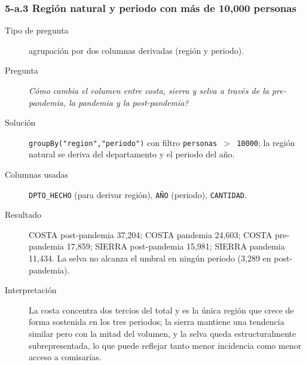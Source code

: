 \subsubsection*{5-a.3 \textbar{} Regi\'on natural y periodo con m\'as de 10,000 personas}
\begin{description}
\item[Tipo de pregunta] agrupaci\'on por dos columnas derivadas (regi\'on y periodo).
\item[Pregunta] \emph{C\'omo cambia el volumen entre costa, sierra y selva a trav\'es de la
      pre-pandemia, la pandemia y la post-pandemia?}
\item[Soluci\'on] \texttt{groupBy("region","periodo")} con filtro \texttt{personas $>$ 10000};
      la regi\'on natural se deriva del departamento y el periodo del a\~no.
\item[Columnas usadas] \texttt{DPTO\_HECHO} (para derivar regi\'on), \texttt{A\~NO} (periodo),
      \texttt{CANTIDAD}.
\item[Resultado] COSTA post-pandemia 37,204; COSTA pandemia 24,603; COSTA pre-pandemia 17,859;
      SIERRA post-pandemia 15,981; SIERRA pandemia 11,434. La selva no alcanza el umbral en
      ning\'un periodo (3,289 en post-pandemia).
\item[Interpretaci\'on] La costa concentra dos tercios del total y es la \'unica regi\'on que
      crece de forma sostenida en los tres periodos; la sierra mantiene una tendencia similar
      pero con la mitad del volumen, y la selva queda estructuralmente subrepresentada, lo que
      puede reflejar tanto menor incidencia como menor acceso a comisar\'ias.
\end{description}

